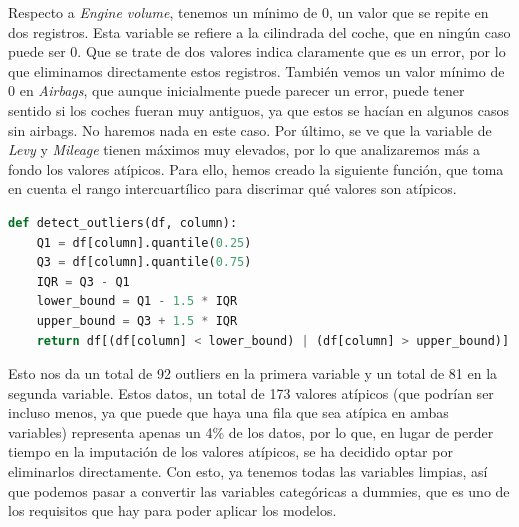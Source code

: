 \documentclass[a4paper,onecolumn]{extarticle}
\begin{document}
\begin{sloppypar}
Respecto a \textit{Engine volume}, tenemos un mínimo de 0, un valor que se repite en dos registros. Esta variable se refiere a la cilindrada del coche, que en 
ningún caso puede ser 0. Que se trate de dos valores indica claramente que es un error, por lo que eliminamos directamente estos registros. También vemos un 
valor mínimo de 0 en \textit{Airbags}, que aunque inicialmente puede parecer un error, puede tener sentido si los coches fueran muy antiguos, ya que estos se 
hacían en algunos casos sin airbags. No haremos nada en este caso. Por último, se ve que la variable de \textit{Levy} y \textit{Mileage} tienen máximos muy 
elevados, por lo que analizaremos más a fondo los valores atípicos. Para ello, hemos creado la siguiente función, que toma en cuenta el rango intercuartílico 
para discrimar qué valores son atípicos.
\begin{lstlisting}[language=Python]
def detect_outliers(df, column):
    Q1 = df[column].quantile(0.25)
    Q3 = df[column].quantile(0.75)
    IQR = Q3 - Q1
    lower_bound = Q1 - 1.5 * IQR
    upper_bound = Q3 + 1.5 * IQR
    return df[(df[column] < lower_bound) | (df[column] > upper_bound)]
\end{lstlisting}

Esto nos da un total de 92 outliers en la primera variable y un total de 81 en la segunda variable. Estos datos, un total de 173 valores atípicos (que podrían 
ser incluso menos, ya que puede que haya una fila que sea atípica en ambas variables) representa apenas un 4\% de los datos, por lo que, en lugar de perder 
tiempo en la imputación de los valores atípicos, se ha decidido optar por eliminarlos directamente. Con esto, ya tenemos todas las variables limpias, así que 
podemos pasar a convertir las variables categóricas a dummies, que es uno de los requisitos que hay para poder aplicar los modelos.


\end{sloppypar}
\end{document}
